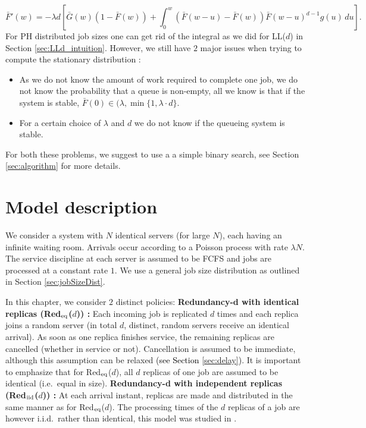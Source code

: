 \documentclass[12pt]{report}
\newcommand{\Redid}{Red$_{\textup{eq}}$($d$)}
\newcommand{\Redind}{Red$_{\textup{iid}}$($d$)}
\begin{document}
$$
\bar F'(w) = -\lambda d \left[ \bar G(w) (1-\bar F(w)) + \int_0^w (\bar F(w-u) - \bar F(w)) \bar F(w-u)^{d-1} g(u) \, du \right].
$$
For PH distributed job sizes one can get rid of the integral as we did for LL($d$) in Section \ref{sec:LLd_intuition}. However, we still have $2$ major issues when trying to compute the stationary distribution :
\begin{itemize}
\item As we do not know the amount of work required to complete one job, we do not know the probability that a queue is non-empty, all we know is that if the system is stable, $\bar F(0) \in (\lambda, \min\{1, \lambda \cdot d\}$.
\item For a certain choice of $\lambda$ and $d$ we do not know if the queueing system is stable. 
\end{itemize}
For both these problems, we suggest to use a a simple binary search, see Section \ref{sec:algorithm} for more details.


\section{Model description}\label{sec:model_Redd}
We consider a system with $N$ identical servers (for large $N$), each having an infinite waiting room. Arrivals occur according to a Poisson process
with rate $\lambda N$. The service discipline at each server is assumed to be FCFS and jobs are processed at a constant rate $1$. We use a general job size distribution as outlined in Section \ref{sec:jobSizeDist}.

In this chapter, we consider $2$ distinct policies:
\newline
\textbf{Redundancy-d with identical replicas (\Redid ) : }Each incoming job is replicated $d$ times and each replica joins a random server (in total $d$, distinct, random servers receive 
an identical arrival). As soon as one replica finishes service, the remaining replicas are cancelled (whether in service or not). 
Cancellation is assumed to be immediate, although this assumption can be relaxed \textcolor{black}{(see Section \ref{sec:delay})}. It is important to emphasize that for \Redid, all $d$ replicas of one job are assumed to be identical (i.e.~equal in size).
\newline
\textbf{Redundancy-d with independent replicas (\Redind ) : }At each arrival instant, replicas are made and distributed in the same manner as for \Redid . The processing times of the $d$ replicas of a job are however i.i.d.~rather than identical, this model was studied in \cite{gardnerOR}.
\newline
\end{document}
